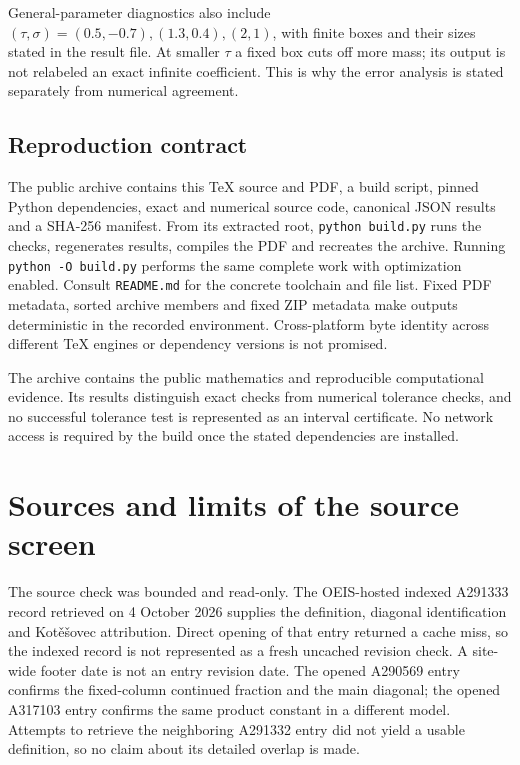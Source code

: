 \documentclass[11pt,letterpaper]{article}
\numberwithin{equation}{section}
\theoremstyle{remark}\newtheorem{remark}[theorem]{Remark}
\begin{document}
General-parameter diagnostics also include $(\tau,\sigma)=(0.5,-0.7),(1.3,0.4),(2,1)$, with finite boxes and their sizes stated in the result file. At smaller $\tau$ a fixed box cuts off more mass; its output is not relabeled an exact infinite coefficient. This is why the error analysis is stated separately from numerical agreement.

\subsection{Reproduction contract}
The public archive contains this TeX source and PDF, a build script, pinned Python dependencies, exact and numerical source code, canonical JSON results and a SHA-256 manifest. From its extracted root, \texttt{python build.py} runs the checks, regenerates results, compiles the PDF and recreates the archive. Running \texttt{python -O build.py} performs the same complete work with optimization enabled. Consult \texttt{README.md} for the concrete toolchain and file list. Fixed PDF metadata, sorted archive members and fixed ZIP metadata make outputs deterministic in the recorded environment. Cross-platform byte identity across different TeX engines or dependency versions is not promised.

The archive contains the public mathematics and reproducible computational evidence. Its results distinguish exact checks from numerical tolerance checks, and no successful tolerance test is represented as an interval certificate. No network access is required by the build once the stated dependencies are installed.

\section{Sources and limits of the source screen}\label{pwd:dg:sec:sources}
The source check was bounded and read-only. The OEIS-hosted indexed A291333 record retrieved on 4 October 2026 supplies the definition, diagonal identification and Kot\v e\v sovec attribution. Direct opening of that entry returned a cache miss, so the indexed record is not represented as a fresh uncached revision check. A site-wide footer date is not an entry revision date. The opened A290569 entry confirms the fixed-column continued fraction and the main diagonal; the opened A317103 entry confirms the same product constant in a different model. Attempts to retrieve the neighboring A291332 entry did not yield a usable definition, so no claim about its detailed overlap is made.
\end{document}
